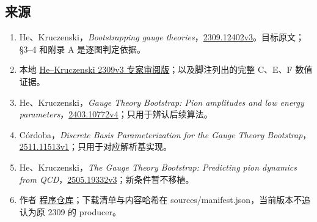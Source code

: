 \documentclass[
  11pt,
  a4paper,
]{article}
\providecommand{\tightlist}{%
  \setlength{\itemsep}{0pt}\setlength{\parskip}{0pt}}
\begin{document}
\subsection{来源}\label{ux6765ux6e90}

\begin{enumerate}
\def\labelenumi{\arabic{enumi}.}
\tightlist
\item
  He、Kruczenski，\emph{Bootstrapping gauge
  theories}，\href{https://arxiv.org/abs/2309.12402v3}{2309.12402v3}。目标原文；§3--4
  和附录 A 是逐图判定依据。
\item
  本地
  \href{../../reports/expert_review_20260910/He_Kruczenski_2309v3_Expert_Review_ZH.pdf}{He--Kruczenski
  2309v3 专家审阅版}；以及脚注列出的完整 C、E、F 数值证据。
\item
  He、Kruczenski，\emph{Gauge Theory Bootstrap: Pion amplitudes and low
  energy
  parameters}，\href{https://arxiv.org/abs/2403.10772v4}{2403.10772v4}；只用于辨认后续算法。
\item
  Córdoba，\emph{Discrete Basis Parameterization for the Gauge Theory
  Bootstrap}，\href{https://arxiv.org/abs/2511.11513v1}{2511.11513v1}；只用于对应解析基实现。
\item
  He、Kruczenski，\emph{The Gauge Theory Bootstrap: Predicting pion
  dynamics from
  QCD}，\href{https://arxiv.org/abs/2505.19332v3}{2505.19332v3}；新条件暂不移植。
\item
  作者
  \href{https://github.com/hyfysics/gauge-theory-bootstrap}{程序仓库}；下载清单与内容哈希在
  sources/manifest.json，当前版本不追认为原 2309 的 producer。
\end{enumerate}
\end{document}
